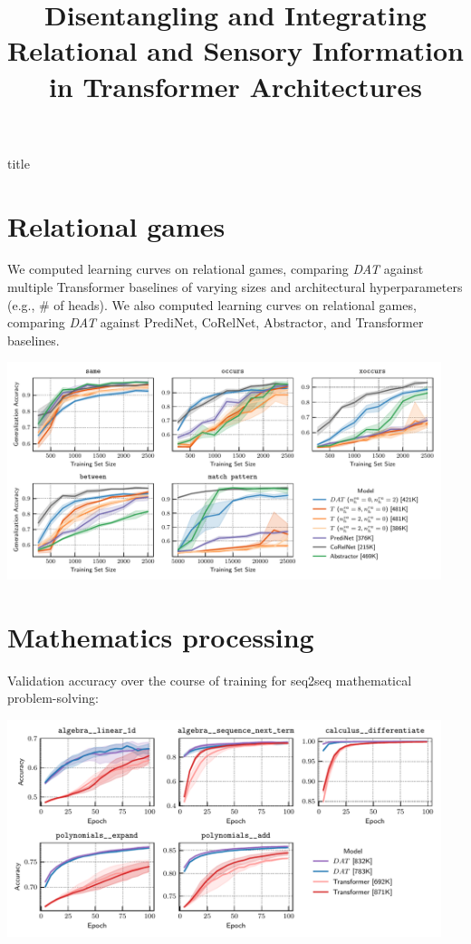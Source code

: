 \documentclass[a0,landscape,pdftex]{a0poster}
\title{Disentangling and Integrating Relational and Sensory Information in Transformer Architectures}
\date{}
\begin{document}
\begin{staticcontents*}{title}
\maketitle
\end{staticcontents*}
\thispagestyle{empty}

\Large

\section*{Relational games}

\begin{minipage}{55cm}

We computed learning curves on relational games, comparing \textit{DAT} against multiple Transformer baselines of varying sizes and architectural hyperparameters (e.g., \# of heads). We also 
computed learning curves on relational games, comparing \textit{DAT} against PrediNet, CoRelNet, Abstractor, and Transformer baselines.


\begin{center}
\includegraphics[width=0.95\textwidth]{../figs/experiments/relgames/relgames_learning_curves_baseline_comparisons.pdf}
\end{center}


\section*{Mathematics processing}


Validation accuracy over the course of training for seq2seq mathematical problem-solving:

\includegraphics[width=0.95\textwidth]{../figs/experiments/math/math_training_curves_interpolation.pdf}
\end{minipage}
\end{document}
